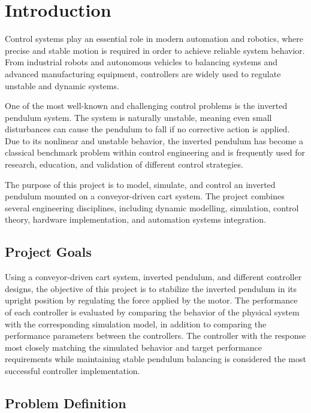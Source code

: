 \clearpage
\chapter{Introduction}
\label{chap:introduction}

Control systems play an essential role in modern automation and robotics, where precise and stable motion is required in order to achieve reliable system behavior. From industrial robots and autonomous vehicles to balancing systems and advanced manufacturing equipment, controllers are widely used to regulate unstable and dynamic systems.

One of the most well-known and challenging control problems is the inverted pendulum system. The system is naturally unstable, meaning even small disturbances can cause the pendulum to fall if no corrective action is applied. Due to its nonlinear and unstable behavior, the inverted pendulum has become a classical benchmark problem within control engineering and is frequently used for research, education, and validation of different control strategies.

The purpose of this project is to model, simulate, and control an inverted pendulum mounted on a conveyor-driven cart system. The project combines several engineering disciplines, including dynamic modelling, simulation, control theory, hardware implementation, and automation systems integration.



\section{Project Goals}

Using a conveyor-driven cart system, inverted pendulum, and different controller designs, the objective of this project is to stabilize the inverted pendulum in its upright position by regulating the force applied by the motor. The performance of each controller is evaluated by comparing the behavior of the physical system with the corresponding simulation model, in addition to comparing the performance parameters between the controllers. The controller with the response most closely matching the simulated behavior and target performance requirements while maintaining stable pendulum balancing is considered the most successful controller implementation.


\section{Problem Definition}

